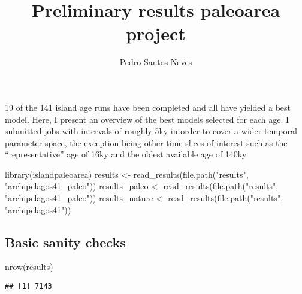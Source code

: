 \documentclass[
]{article}
\title{Preliminary results paleoarea project}
\author{Pedro Santos Neves}
\date{}
\newenvironment{Shaded}{\begin{snugshade}}{\end{snugshade}}
\newcommand{\FunctionTok}[1]{\textcolor[rgb]{0.00,0.00,0.00}{#1}}
\newcommand{\NormalTok}[1]{#1}
\newcommand{\OtherTok}[1]{\textcolor[rgb]{0.56,0.35,0.01}{#1}}
\newcommand{\SpecialCharTok}[1]{\textcolor[rgb]{0.00,0.00,0.00}{#1}}
\newcommand{\StringTok}[1]{\textcolor[rgb]{0.31,0.60,0.02}{#1}}
\begin{document}
\maketitle

19 of the 141 island age runs have been completed and all have yielded a
best model. Here, I present an overview of the best models selected for
each age. I submitted jobs with intervals of roughly 5ky in order to
cover a wider temporal parameter space, the exception being other time
slices of interest such as the ``representative'' age of 16ky and the
oldest available age of 140ky.

\begin{Shaded}
\begin{Highlighting}[]
\FunctionTok{library}\NormalTok{(islandpaleoarea)}
\NormalTok{results }\OtherTok{\textless{}{-}} \FunctionTok{read\_results}\NormalTok{(}\FunctionTok{file.path}\NormalTok{(}\StringTok{"results"}\NormalTok{, }\StringTok{"archipelagos41\_paleo"}\NormalTok{))}
\NormalTok{results\_paleo }\OtherTok{\textless{}{-}} \FunctionTok{read\_results}\NormalTok{(}\FunctionTok{file.path}\NormalTok{(}\StringTok{"results"}\NormalTok{, }\StringTok{"archipelagos41\_paleo"}\NormalTok{))}
\NormalTok{results\_nature }\OtherTok{\textless{}{-}} \FunctionTok{read\_results}\NormalTok{(}\FunctionTok{file.path}\NormalTok{(}\StringTok{"results"}\NormalTok{, }\StringTok{"archipelagos41"}\NormalTok{))}
\end{Highlighting}
\end{Shaded}

\hypertarget{basic-sanity-checks}{%
\subsection{Basic sanity checks}\label{basic-sanity-checks}}

\begin{Shaded}
\begin{Highlighting}[]
\FunctionTok{nrow}\NormalTok{(results)}
\end{Highlighting}
\end{Shaded}

\begin{verbatim}
## [1] 7143
\end{verbatim}

\begin{Shaded}
\end{Shaded}
\end{document}
